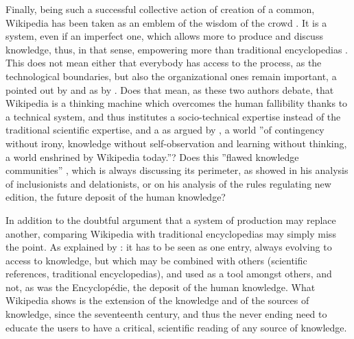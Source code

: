 
Finally, being such a successful collective action of creation of
a common, Wikipedia has been taken as an emblem of the wisdom of the
crowd \citep{Surowiecki04}. It is a system, even if an imperfect
one, which allows more to produce and discuss knowledge, thus, in
that sense, empowering more than traditional encyclopedias \citep{HansenBerenteLyytinen09}.
This does not mean either that everybody has access to the process,
as the technological boundaries, but also the organizational ones
remain important, a pointed out by \citet{Hartelius10} and \citet{Pfister11}
as by \citet{Perovic09}. Does that mean, as these two authors debate,
that Wikipedia is a thinking machine which overcomes the human fallibility
thanks to a technical system, and thus institutes a socio-technical
expertise instead of the traditional scientific expertise, and a as
argued by \citet{Perovic09}, a world ''of contingency without irony,
knowledge without self-observation and learning without thinking,
a world enshrined by Wikipedia today.''? Does this ''flawed knowledge
communities'' \citep{RobertsPeters11}, which is always discussing
its perimeter, as \citet{Kostakis10} showed in his analysis of inclusionists
and delationists, or \citet{deLaat12} on his analysis of the rules
regulating new edition, the future deposit of the human knowledge?

In addition to the doubtful argument that a system of production may
replace another, comparing Wikipedia with traditional encyclopedias
may simply miss the point. As explained by \citet{Mattus09}: it has
to be seen as one entry, always evolving to access to knowledge, but
which may be combined with others (scientific references, traditional
encyclopedias), and used as a tool amongst others, and not, as was
the Encyclopédie, the deposit of the human knowledge. What Wikipedia
shows is the extension of the knowledge and of the sources of knowledge,
since the seventeenth century, and thus the never ending need to educate
the users to have a critical, scientific reading of any source of
knowledge.
